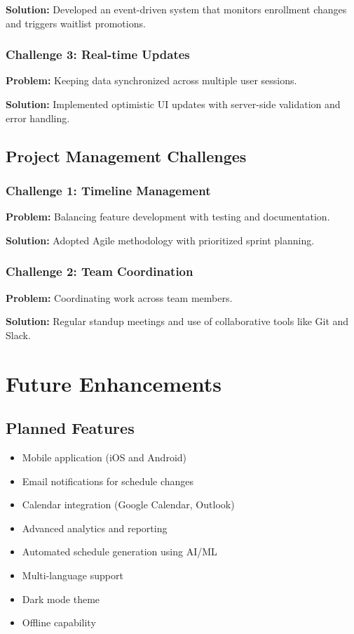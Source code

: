 \documentclass[12pt,a4paper]{report}
\begin{document}
\textbf{Solution:} Developed an event-driven system that monitors enrollment changes and triggers waitlist promotions.

\subsection{Challenge 3: Real-time Updates}
\textbf{Problem:} Keeping data synchronized across multiple user sessions.

\textbf{Solution:} Implemented optimistic UI updates with server-side validation and error handling.

\section{Project Management Challenges}

\subsection{Challenge 1: Timeline Management}
\textbf{Problem:} Balancing feature development with testing and documentation.

\textbf{Solution:} Adopted Agile methodology with prioritized sprint planning.

\subsection{Challenge 2: Team Coordination}
\textbf{Problem:} Coordinating work across team members.

\textbf{Solution:} Regular standup meetings and use of collaborative tools like Git and Slack.

\chapter{Future Enhancements}

\section{Planned Features}
\begin{itemize}[leftmargin=*]
    \item Mobile application (iOS and Android)
    \item Email notifications for schedule changes
    \item Calendar integration (Google Calendar, Outlook)
    \item Advanced analytics and reporting
    \item Automated schedule generation using AI/ML
    \item Multi-language support
    \item Dark mode theme
    \item Offline capability
\end{itemize}
\end{document}
